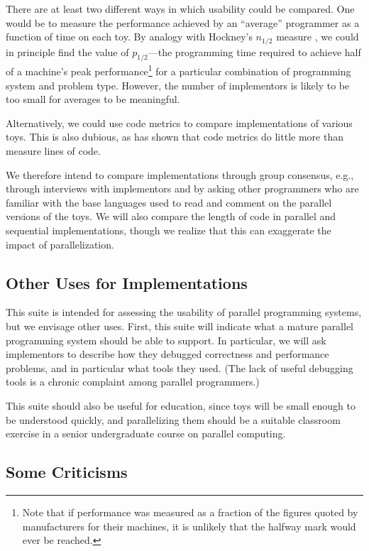 There are at least two different ways in which usability could be compared.
One would be to measure the performance achieved by an ``average'' programmer
as a function of time on each toy.
By analogy with Hockney's $n_{1/2}$ measure \cite{b:hockney-perfparam},
we could in principle find the value of $p_{1/2}$---the programming time required to achieve
half of a machine's peak performance\footnote{Note that
	if performance was measured as a fraction of the figures quoted by manufacturers for their machines,
	it is unlikely that the halfway mark would ever be reached.}
for a particular combination of programming system and problem type.
However,
the number of implementors is likely to be too small for averages to be meaningful.

Alternatively,
we could use code metrics
to compare implementations of various toys.
This is also dubious,
as \cite{b:el-emam-metrics} has shown that code metrics do little more than measure lines of code.

We therefore intend to compare implementations through group consensus,
e.g.,
through interviews with implementors
and by asking other programmers who are familiar with the base languages used
to read and comment on the parallel versions of the toys.
We will also compare the length of code in parallel and sequential implementations,
though we realize that this can exaggerate the impact of parallelization.

\subsection{Other Uses for Implementations\label{s:method-uses}}

This suite is intended for assessing the usability of parallel programming systems,
but we envisage other uses.
First, this suite will indicate
what a mature parallel programming system should be able to support.
In particular,
we will ask implementors to describe how they debugged correctness and performance problems,
and in particular what tools they used.
(The lack of useful debugging tools is a chronic complaint among parallel programmers.)

This suite should also be useful for education,
since toys will be small enough to be understood quickly,
and parallelizing them should be a suitable classroom exercise
in a senior undergraduate course on parallel computing.

\subsection{Some Criticisms\label{s:method-criticism}}

